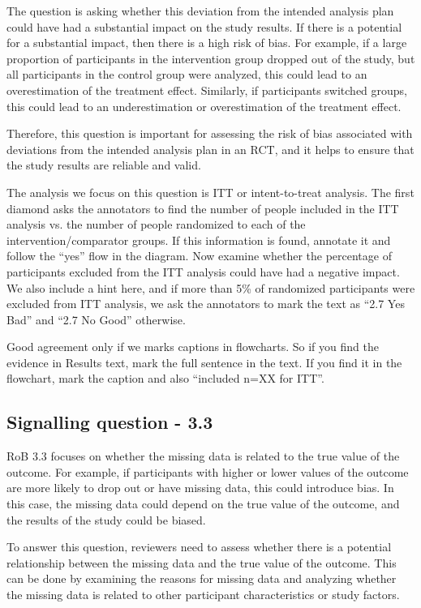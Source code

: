 \documentclass[sn-mathphys,Numbered]{sn-jnl}%
\begin{document}
The question is asking whether this deviation from the intended analysis plan could have had a substantial impact on the study results. If there is a potential for a substantial impact, then there is a high risk of bias. For example, if a large proportion of participants in the intervention group dropped out of the study, but all participants in the control group were analyzed, this could lead to an overestimation of the treatment effect. Similarly, if participants switched groups, this could lead to an underestimation or overestimation of the treatment effect.

Therefore, this question is important for assessing the risk of bias associated with deviations from the intended analysis plan in an RCT, and it helps to ensure that the study results are reliable and valid.


The analysis we focus on this question is ITT or intent-to-treat analysis.
The first diamond asks the annotators to find the number of people included in the ITT analysis vs. the number of people randomized to each of the intervention/comparator groups. 
If this information is found, annotate it and follow the ``yes'' flow in the diagram.
Now examine whether the percentage of participants excluded from the ITT analysis could have had a negative impact.
We also include a hint here, and if more than 5\% of randomized participants were excluded from ITT analysis, we ask the annotators to mark the text as ``2.7 Yes Bad'' and ``2.7 No Good'' otherwise.

Good agreement only if we marks captions in flowcharts.
So if you find the evidence in Results text, mark the full sentence in the text.
If you find it in the flowchart, mark the caption and also ``included n=XX for ITT''.
%
%
%
%
%
%
%
\subsection*{Signalling question - 3.3 }
%
RoB 3.3 focuses on whether the missing data is related to the true value of the outcome. For example, if participants with higher or lower values of the outcome are more likely to drop out or have missing data, this could introduce bias. In this case, the missing data could depend on the true value of the outcome, and the results of the study could be biased.

To answer this question, reviewers need to assess whether there is a potential relationship between the missing data and the true value of the outcome. This can be done by examining the reasons for missing data and analyzing whether the missing data is related to other participant characteristics or study factors.
\end{document}
